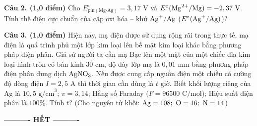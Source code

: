 \documentclass[11pt,a4paper]{article}
\begin{document}
\vspace{1pt}
\noindent
{}

\vspace{2pt}
\noindent
\textbf{Câu 2. (1,0 điểm)} Cho $E^\circ_{\text{pin}(\text{Mg-Ag})} = 3,17\text{ V}$ và $E^\circ(\ce{Mg^2+}/\ce{Mg}) = -2,37\text{ V}$. Tính thế điện cực chuẩn của cặp oxi hóa -- khử $\ce{Ag+}/\ce{Ag}$ ($E^\circ(\ce{Ag+}/\ce{Ag})$)?

\vspace{1pt}
\noindent
{}

\vspace{2pt}
\noindent
\textbf{Câu 3. (1,0 điểm)} Hiện nay, mạ điện được sử dụng rộng rãi trong thực tế, mạ điện là quá trình phủ một lớp kim loại lên bề mặt kim loại khác bằng phương pháp điện phân. Giả sử người ta cần mạ Bạc lên một mặt của một chiếc đĩa kim loại hình tròn có bán kính $30\text{ cm}$, độ dày lớp mạ là $0,01\text{ mm}$ bằng phương pháp điện phân dung dịch $\ce{AgNO3}$. Nếu được cung cấp nguồn điện một chiều có cường độ dòng điện $I = 2,5\text{ A}$ thì thời gian cần dùng là $t\text{ giờ}$. Biết khối lượng riêng của Ag là $10,5\text{ g/cm}^3$; $\pi = 3,14$; Hằng số Faraday ($F = 96500\text{ C/mol}$); Hiệu suất điện phân là $100\%$. Tính $t$? (Cho nguyên tử khối: $\ce{Ag}=108;\ \ce{O}=16;\ \ce{N}=14$)

\vspace{1pt}
\noindent
{}

\vfill
\begin{center}
\textbf{---------- HẾT ----------}
\end{center}
\end{document}
